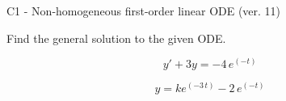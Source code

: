 \begin{exercise}
  \begin{exerciseTitle}C1 - Non-homogeneous first-order linear ODE (ver. 11)\end{exerciseTitle}
  \begin{exerciseStatement}
    
Find the general solution to the given ODE.

    
\[y'+3y= -4 \, e^{\left(-t\right)}\]

  \end{exerciseStatement}
  \begin{exerciseAnswer}
    
\[y= k e^{\left(-3 \, t\right)} - 2 \, e^{\left(-t\right)}\]

  \end{exerciseAnswer}
\end{exercise}